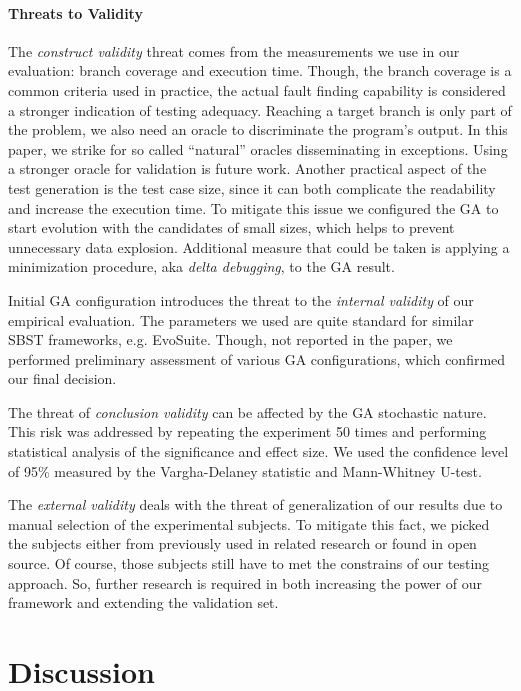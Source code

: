 \documentclass[sigconf,review,anonymous]{acmart}
\begin{document}
\paragraph{\textbf{Threats to Validity}}
The \emph{construct validity} threat comes from the measurements we use in our evaluation: branch coverage and execution time. Though, the branch coverage is a common criteria used in practice, the actual fault finding capability is considered a stronger indication of testing adequacy. Reaching a target branch is only part of the problem, we also need an oracle to discriminate the program's output. In this paper, we strike for so called ``natural'' oracles disseminating in exceptions. Using a stronger oracle for validation is future work. Another practical aspect of the test generation is the test case size, since it can both complicate the readability and increase the execution time. To mitigate this issue we configured the GA to start evolution with the candidates of small sizes, which helps to prevent unnecessary data explosion. Additional measure that could be taken is applying a minimization procedure, aka \emph{delta debugging}, to the GA result.

Initial GA configuration introduces the threat to the \emph{internal validity} of our empirical evaluation. The parameters we used are quite standard for similar SBST frameworks, e.g. EvoSuite. Though, not reported in the paper, we performed preliminary assessment of various GA configurations, which confirmed our final decision.

The threat of \emph{conclusion validity} can be affected by the GA stochastic nature. This risk was addressed by repeating the experiment 50 times and performing statistical analysis of the significance and effect size. We used the confidence level of 95\% measured by the Vargha-Delaney statistic and Mann-Whitney U-test. 

The \emph{external validity} deals with the threat of generalization of our results due to manual selection of the experimental subjects. To mitigate this fact, we picked the subjects either from previously used in related research or found in open source. Of course, those subjects still have to met the constrains of our testing approach. So, further research is required in both increasing the power of our framework and extending the validation set.

\section{Discussion}
\label{sec.disc}
\end{document}
